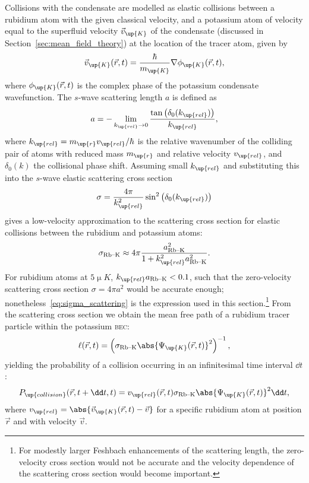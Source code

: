 Collisions with the condensate are modelled as elastic collisions between a rubidium atom with the given classical velocity, and a potassium atom of velocity equal to the superfluid velocity $\vec v_\up{K}$ of the condensate (discussed in Section~\ref{sec:mean_field_theory}) at the location of the tracer atom, given by
\begin{align}
\vec v_\up{K}(\vec r, t) = \frac \hbar {m_\up{K}} \nabla \phi_\up{K}(\vec r, t),
\end{align}
where $\phi_\up{K}(\vec r, t)$ is the complex phase of the potassium condensate wavefunction. The $s$-wave scattering length $a$ is defined as~\cite[p 589, eq.~12.101]{bransden_physics_2003}
\begin{align}
a = -\lim_{k_\up{rel}\rightarrow 0} \frac{\tan\left(\delta_0(k_\up{rel})\right)}{k_\up{rel}},
\end{align}
where $k_\up{rel}=m_\up{r}v_\up{rel}/\hbar$ is the relative wavenumber of the colliding pair of atoms with reduced mass $m_\up{r}$ and relative velocity $v_\up{rel}$, and $\delta_0(k)$ the collisional phase shift. Assuming small $k_\up{rel}$ and substituting this into the $s$-wave elastic scattering cross section~\cite[p 584, eq.~12.66]{bransden_physics_2003} 
\begin{align}
\sigma = \frac{4\pi}{k_\up{rel}^2}\sin^2\left(\delta_0(k_\up{rel})\right)
\end{align}
gives a low-velocity approximation to the scattering cross section for elastic collisions between the rubidium and potassium atoms:
\begin{align}\label{eq:sigma_scattering}
\sigma_{\textrm{Rb--K}} \approx 4\pi\frac{a_{\textrm{Rb--K}}^2}{1 + k_\up{rel}^2a_{\textrm{Rb--K}}^2}.
\end{align}
For rubidium atoms at $5\unit{\upmu K}$, $k_\up{rel}a_{\textrm{Rb--K}} < 0.1$, such that the zero-velocity scattering cross section $\sigma = 4\pi a^2$ would be accurate enough; nonetheless~\eqref{eq:sigma_scattering} is the expression used in this section.\footnote{For modestly larger Feshbach enhancements of the scattering length, the zero-velocity cross section would not be accurate and the velocity dependence of the scattering cross section would become important.} From the scattering cross section we obtain the mean free path of a rubidium tracer particle within the potassium \textsc{bec}:
\begin{align}
\ell(\vec r, t) = \left(\sigma_{\textrm{Rb--K}}\abs{\Psi_\up{K}(\vec r, t)}^2\right)^{-1},
\end{align}
yielding the probability of a collision occurring in an infinitesimal time interval $\dd t$:
\begin{align}\label{eq:P_collision}
P_\up{collision}(\vec r, t+\dd t, t) = v_\up{rel}(\vec r, t)\sigma_{\textrm{Rb--K}}\abs{\Psi_\up{K}(\vec r, t)}^2\dd t,
\end{align}
where $v_\up{rel} = \abs{\vec v_\up{K}(\vec r, t) - \vec v}$ for a specific rubidium atom at position $\vec r$ and with velocity $\vec v$.

